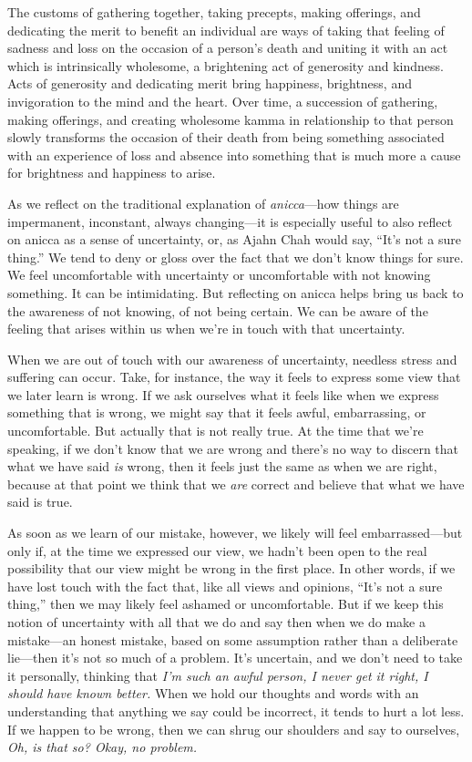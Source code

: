 The customs of gathering together, taking precepts, making offerings, 
and dedicating the merit to benefit an individual are ways of taking 
that feeling of sadness and loss on the occasion of a person's death 
and uniting it with an act which is intrinsically wholesome, a 
brightening act of generosity and kindness. Acts of generosity and 
dedicating merit bring happiness, brightness, and invigoration to the 
mind and the heart. Over time, a succession of gathering, making 
offerings, and creating wholesome kamma in relationship to that person 
slowly transforms the occasion of their death from being something 
associated with an experience of loss and absence into something that 
is much more a cause for brightness and happiness to arise.


As we reflect on the traditional explanation of \emph{anicca}---how 
things are impermanent, inconstant, always changing---it is especially 
useful to also reflect on anicca as a sense of uncertainty, or, as 
Ajahn Chah would say, ``It's not a sure thing.'' We tend to deny or 
gloss over the fact that we don't know things for sure. We feel 
uncomfortable with uncertainty or uncomfortable with not knowing 
something. It can be intimidating. But reflecting on anicca helps bring 
us back to the awareness of not knowing, of not being certain. We can 
be aware of the feeling that arises within us when we're in touch with 
that uncertainty.

When we are out of touch with our awareness of uncertainty, needless 
stress and suffering can occur. Take, for instance, the way it feels to 
express some view that we later learn is wrong. If we ask ourselves 
what it feels like when we express something that is wrong, we might 
say that it feels awful, embarrassing, or uncomfortable. But actually 
that is not really true. At the time that we're speaking, if we don't 
know that we are wrong and there's no way to discern that what we have 
said \emph{is} wrong, then it feels just the same as when we are right, 
because at that point we think that we \emph{are} correct and believe 
that what we have said is true.

As soon as we learn of our mistake, however, we likely will feel 
embarrassed---but only if, at the time we expressed our view, we hadn't 
been open to the real possibility that our view might be wrong in the 
first place. In other words, if we have lost touch with the fact that, 
like all views and opinions, ``It's not a sure thing,'' then we may 
likely feel ashamed or uncomfortable. But if we keep this notion of 
uncertainty with all that we do and say then when we do make a 
mistake---an honest mistake, based on some assumption rather than a 
deliberate lie---then it's not so much of a problem. It's uncertain, 
and we don't need to take it personally, thinking that \emph{I'm such 
an awful person, I never get it right, I should have known better.} 
When we hold our thoughts and words with an understanding that anything 
we say could be incorrect, it tends to hurt a lot less. If we happen to 
be wrong, then we can shrug our shoulders and say to ourselves, 
\emph{Oh, is that so? Okay, no problem.}


